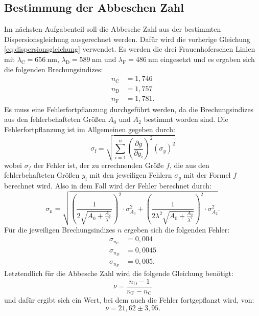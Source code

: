 \subsection{Bestimmung der Abbeschen Zahl}
Im nächsten Aufgabenteil soll die Abbesche Zahl aus der bestimmten Dispersionsgleichung ausgerechnet werden. Dafür wird die vorherige Gleichung \ref{eq:dispersionsgleichung} verwendet. Es werden die drei Frauenhoferschen Linien mit $\lambda_\text{C}= \SI{656}{\nano\meter}$, $\lambda_\text{D} = \SI{589}{\nano\meter}$ und $\lambda_\text{F} = \SI{486}{\nano\meter}$ eingesetzt und es ergaben sich die folgenden Brechungsindizes:
\begin{align*}
n_\text{C} &= 1,746 \\
n_\text{D} &= 1,757 \\
n_\text{F} &= 1,781.
\end{align*}
Es muss eine Fehlerfortpflanzung durchgeführt werden, da die Brechungsindizes aus den fehlerbehafteten Größen $A_0$ und $A_2$ bestimmt worden sind. Die Fehlerfortpflanzung ist im Allgemeinen gegeben durch:
\begin{equation}
\label{eq:gaußallg}
\sigma_\text{f} = \sqrt{\sum_{i=1}^{n} \left(\frac{\partial g}{\partial y_i}\right)^2 (\sigma_y)^2}
\end{equation}
wobei $\sigma_f$ der Fehler ist, der zu errechnenden Größe $f$, die aus den fehlerbehafteten Größen $y_\text{i}$ mit den jeweiligen Fehlern $\sigma_y$ mit der Formel $f$ berechnet wird. Also in dem Fall wird der Fehler berechnet durch:
\begin{equation}
\label{eq:fehlergauß}
\sigma_\text{n} = \sqrt{\left(\frac{1}{2\sqrt{A_0+\frac{A_2}{\lambda^2}}}\right)^2 \cdot \sigma^2_{A_0} + \left(\frac{1}{2 \lambda^2 \sqrt{A_0 + \frac{A_2}{\lambda^2}}}\right)^2 \cdot \sigma^2_{A_2}}.
\end{equation}
Für die jeweiligen Brechungsindizes $n$ ergeben sich die folgenden Fehler:
\begin{align*}
\sigma_{n_C} &= 0,004 \\
\sigma_{n_D} &= 0,0045 \\
\sigma_{n_F} &= 0,005.
\end{align*}
Letztendlich für die Abbesche Zahl wird die folgende Gleichung benötigt:
\begin{equation}
\label{eq:abbesche}
\nu = \frac{n_\text{D}-1}{n_\text{F} - n_\text{C}}
\end{equation}
und dafür ergibt sich ein Wert, bei dem auch die Fehler fortgepflanzt wird, von:
\begin{equation*}
\nu = 21,62 \pm 3,95.
\end{equation*}

